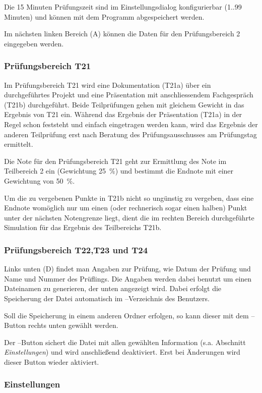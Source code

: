 \documentclass[a4paper,notitlepage,parskip=half]{scrartcl}
\begin{document}
Die 15 Minuten Prüfungszeit sind im Einstellungsdialog konfigurierbar (1..99 Minuten) und können mit dem Programm abgespeichert werden.

Im nächsten linken Bereich (A) können die Daten für den Prüfungsbereich 2 eingegeben werden.

\subsubsection{Prüfungsbereich T21}
Im Prüfungsbereich T21 wird eine Dokumentation (T21a) über ein durchgeführtes Projekt und eine Präsentation mit anschliessendem Fachgespräch (T21b) durchgeführt. Beide Teilprüfungen gehen mit gleichem Gewicht in das Ergebnis von T21 ein. Während das Ergebnis der Präsentation (T21a) in der Regel schon feststeht und einfach eingetragen werden kann, wird das Ergebnis der anderen Teilprüfung erst nach Beratung des Prüfungsausschusses am Prüfungstag ermittelt.

Die Note für den Prüfungsbereich T21 geht zur Ermittlung des Note im Teilbereich 2 ein (Gewichtung 25~\%) und bestimmt die Endnote mit einer Gewichtung von 50~\%.

Um die zu vergebenen Punkte in T21b nicht so ungünstig zu vergeben, dass eine Endnote womöglich nur um einen (oder rechnerisch sogar einen halben) Punkt unter der nächsten Notengrenze liegt, dient die im rechten Bereich durchgeführte Simulation für das Ergebnis des Teilbereichs T21b. 


\subsubsection{Prüfungsbereich T22,T23 und T24}

Links unten (D) findet man Angaben zur Prüfung, wie Datum der Prüfung und Name und Nummer des Prüflings.
Die Angaben werden dabei benutzt um einen Dateinamen zu generieren, der unten angezeigt wird. Dabei erfolgt die Speicherung der Datei automatisch im --Verzeichnis des Benutzers.

Soll die Speicherung in einem anderen Ordner erfolgen, so kann dieser mit dem --Button rechts unten gewählt werden.

Der --Button sichert die Datei mit allen gewählten Information (s.a. Abschnitt \emph{Einstellungen}) und wird anschließend deaktiviert. Erst bei Änderungen wird dieser Button wieder aktiviert.

\subsubsection{Einstellungen}
\end{document}
